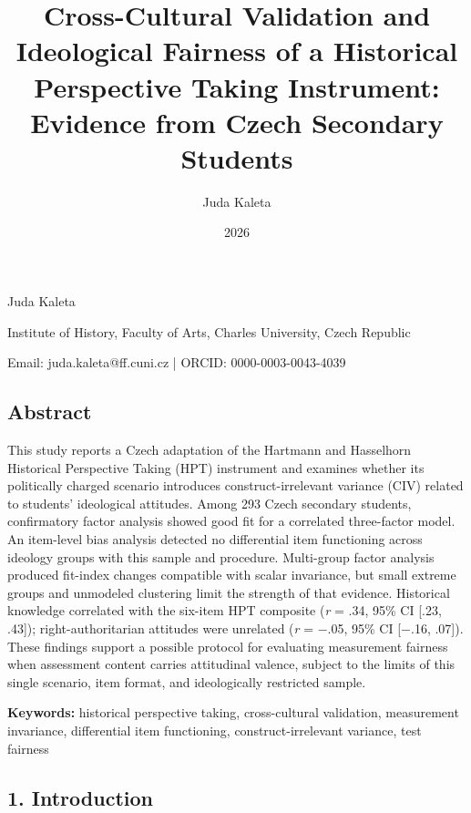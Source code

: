 \documentclass[
  12pt,
]{article}
\title{Cross-Cultural Validation and Ideological Fairness of a Historical Perspective Taking Instrument: Evidence from Czech Secondary Students}
\author{Juda Kaleta}
\date{2026}
\newcommand{\Loc}[1]{\linelabel{loc:#1}}
\newcommand{\LocEnd}[1]{\linelabel{loc:#1:end}}
\begin{document}
\maketitle

Juda Kaleta

Institute of History, Faculty of Arts, Charles University, Czech Republic

Email: juda.kaleta@ff.cuni.cz | ORCID: 0000-0003-0043-4039

\hypertarget{abstract}{%
\subsection{Abstract}\label{abstract}}

\Loc{abstract}This study reports a Czech adaptation of the Hartmann and
Hasselhorn Historical Perspective Taking (HPT) instrument and examines
whether its politically charged scenario introduces
construct-irrelevant variance (CIV) related to students' ideological
attitudes. Among 293 Czech secondary students, confirmatory factor
analysis showed good fit for a correlated three-factor model. An item-level
bias analysis detected no differential item functioning across ideology
groups with this sample and procedure. Multi-group factor analysis
produced fit-index changes compatible with scalar invariance, but
small extreme groups and unmodeled clustering limit the strength of that
evidence. Historical knowledge
correlated with the six-item HPT composite (\emph{r} = .34, 95\% CI [.23, .43]); right-authoritarian attitudes were
unrelated (\emph{r} = $-$.05, 95\% CI [$-$.16, .07]). These findings support a
possible protocol for evaluating measurement fairness when assessment
content carries attitudinal valence, subject to the limits of this
single scenario, item format, and ideologically restricted sample.\LocEnd{abstract}

\textbf{Keywords:} historical perspective taking, cross-cultural validation, measurement invariance, differential item functioning, construct-irrelevant variance, test fairness

\hypertarget{introduction}{%
\subsection{1. Introduction}\label{introduction}}
\end{document}
